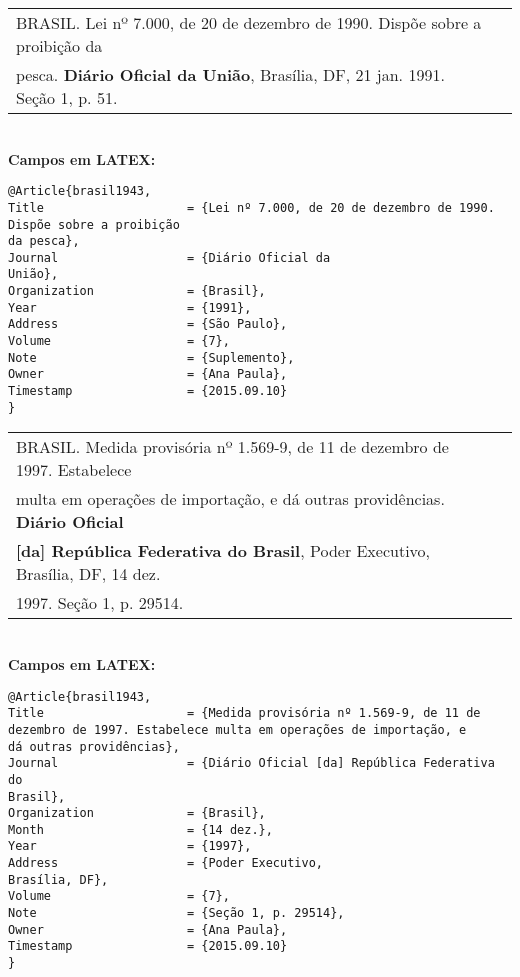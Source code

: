 \begin{tabular}{|l|c|} \hline
	BRASIL. Lei nº 7.000, de 20 de dezembro de 1990. Dispõe sobre a proibição
	da \\ pesca. \textbf{Diário Oficial da União}, Brasília, DF, 21 jan. 1991. Seção 1, p. 51.
	\\\hline
\end{tabular} \\

\textbf{Campos em LATEX:} 

\begin{verbatim}
@Article{brasil1943,
Title                    = {Lei nº 7.000, de 20 de dezembro de 1990. 
Dispõe sobre a proibição
da pesca},
Journal                  = {Diário Oficial da
União},
Organization             = {Brasil},
Year                     = {1991},
Address                  = {São Paulo},
Volume                   = {7},
Note                     = {Suplemento},
Owner                    = {Ana Paula},
Timestamp                = {2015.09.10}
}
\end{verbatim}

\begin{tabular}{|l|c|} \hline
	BRASIL. Medida provisória nº 1.569-9, de 11 de dezembro de 1997.
	Estabelece \\ multa em operações de importação, e dá outras providências.
	\textbf{Diário Oficial} \\ \textbf{[da] República Federativa do Brasil}, Poder Executivo,
	Brasília, DF, 14 dez.\\
	1997. Seção 1, p. 29514. \\\hline
\end{tabular} \\

\textbf{Campos em LATEX:} 

\begin{verbatim}
@Article{brasil1943,
Title                    = {Medida provisória nº 1.569-9, de 11 de 
dezembro de 1997. Estabelece multa em operações de importação, e 
dá outras providências},
Journal                  = {Diário Oficial [da] República Federativa do 
Brasil},
Organization             = {Brasil},
Month                    = {14 dez.},
Year                     = {1997},
Address                  = {Poder Executivo,
Brasília, DF},
Volume                   = {7},
Note                     = {Seção 1, p. 29514},
Owner                    = {Ana Paula},
Timestamp                = {2015.09.10}
}
\end{verbatim}


